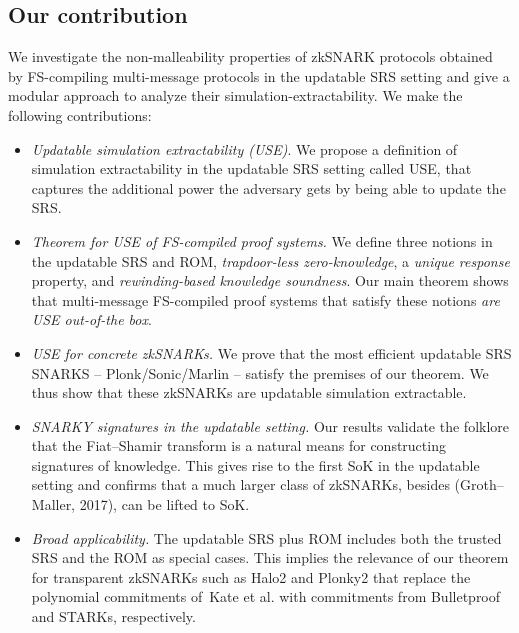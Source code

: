 \documentclass[11pt]{llncs}
\begin{document}
\subsection{Our contribution}
We investigate the non-malleability properties of zkSNARK protocols obtained by FS-compiling multi-message protocols in the updatable SRS setting and give a modular approach to analyze their simulation-extractability. We make the following contributions:
\begin{itemize}
\item 
\emph{Updatable simulation extractability (USE)}. 
We propose a definition of simulation extractability in the updatable SRS setting called USE, that captures the additional power the adversary gets by being able to update the SRS. 
    
\item \emph{Theorem for USE of FS-compiled proof systems.} We
         define three notions in the updatable SRS and ROM, 
        \emph{trapdoor-less zero-knowledge},
        a \emph{unique response} property, and \emph{rewinding-based
        knowledge soundness}. Our main theorem shows that multi-message FS-compiled proof systems that satisfy these notions \emph{are USE
        out-of-the box}.
    
\item
\emph{USE for concrete zkSNARKs.}
We prove that the most efficient updatable SRS SNARKS -- Plonk/Sonic/Marlin -- satisfy the premises of our theorem. We thus show that these zkSNARKs are updatable simulation extractable.

\item
  \emph{SNARKY signatures in the updatable setting.} Our results validate the folklore that the Fiat--Shamir transform is a natural means for constructing signatures of knowledge. This gives rise to the first SoK in the updatable setting and confirms that a much larger class of zkSNARKs, besides (Groth--Maller, 2017), can be lifted to SoK.

\item \emph{Broad applicability.} The updatable SRS plus ROM includes both the trusted SRS and the ROM as special cases. This implies the relevance of our theorem for transparent zkSNARKs such as Halo2 and Plonky2 that replace the polynomial commitments of~Kate et al. with commitments from Bulletproof and STARKs, respectively.
  
\end{itemize}
\end{document}
